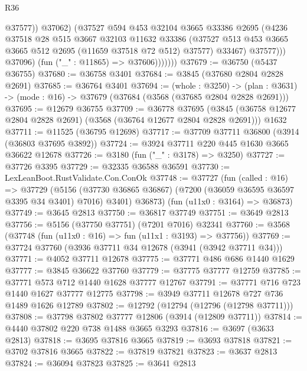 \begin{lexlean}{R36}
\begin{coremodule}
                            @37577))
                        @37062)
                      (@37527
                        @594
                        @453
                        @32104
                        @3665
                        @33386
                        @2695
                        (@4236
                          @37518
                          @28
                          @515
                          @3667
                          @32103
                          @11632
                          @33386
                          (@37527 @513 @453 @3665 @3665 @512 @2695 (@11659 @37518 @72 @512) @37577)
                          @33467)
                        @37577)))
                  @37096)
                (fun ("_" : @11865) => @37606)))))))
@37679 := @36750 (@5437 @36755)
@37680 := @36758 @3401
@37684 := @3845 (@37680 @2804 @2828 @2691)
@37685 := @36764 @3401
@37694 := (whole : @3250) ->
  (plan : @3631) -> (mode : @16) -> @37679 (@37684 (@3568 (@37685 @2804 @2828 @2691)))
@37695 := @12679 @36755
@37709 := @36778
    @37695
    (@3845 (@36758 @12677 @2804 @2828 @2691) (@3568 (@36764 @12677 @2804 @2828 @2691)))
    @1632
@37711 := @11525 (@36795 @12698)
@37717 := @37709 @37711 @36800 (@3914 (@36803 @37695 @3892))
@37724 := @3924 @37711 @220 @445 @1630 @3665 @36622 @12678
@37726 := @3180 (fun ("_" : @3178) => @3250)
@37727 := @37726 @3395
@37729 := @32335 @36588 @36591
@37730 := LexLeanBoot.RustValidate.Con.ConOk
@37748 := @37727
    (fun (called : @16) =>
    @37729
      (@5156 (@37730 @36865 @36867) (@7200 (@36059 @36595 @36597 @3395 @34 @3401) @7016) @3401)
      @36873)
    (fun (u11x0 : @3164) => @36873)
@37749 := @3645 @2813
@37750 := @36817 @37749
@37751 := @3649 @2813
@37756 := @5156 (@37750 @37751) (@7201 @7016) @32341
@37760 := @3568 (@37748 (fun (u11x0 : @16) => fun (u11x1 : @3193) => @37756))
@37769 := @37724 @37760 (@3936 @37711 @34 @12678 (@3941 (@3942 @37711 @34)))
@37771 := @4052 @37711 @12678
@37775 := @37771 @486 @686 @1440 @1629
@37777 := @3845 @36622 @37760
@37779 := @37775 @37777 @12759
@37785 := @37771 @573 @712 @1440 @1628 @37777 @12767
@37791 := @37771 @716 @723 @1440 @1627 @37777 @12775
@37798 := @3949 @37711 @12678 @727 @736 @1489 @1626 @12789
@37802 := @12792 (@12794 (@12796 (@12798 @37711)))
@37808 := @37798 @37802 @37777 @12806 (@3914 (@12809 @37711))
@37814 := @4440 @37802 @220 @738 @1488 @3665 @3293
@37816 := @3697 (@3633 @2813)
@37818 := @3695 @37816 @3665
@37819 := @3693 @37818
@37821 := @3702 @37816 @3665
@37822 := @37819 @37821
@37823 := @3637 @2813
@37824 := @36094 @37823
@37825 := @3641 @2813

\end{coremodule}
\end{lexlean}
